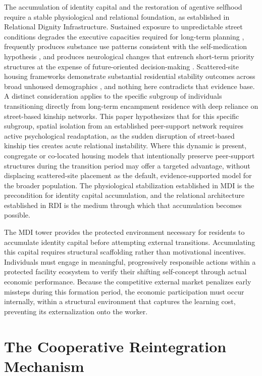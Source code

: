\documentclass[12pt, letterpaper]{article}
\begin{document}
The accumulation of identity capital and the restoration of agentive selfhood require a stable physiological and relational foundation, as established in Relational Dignity Infrastructure. Sustained exposure to unpredictable street conditions degrades the executive capacities required for long-term planning \citep{arnsten2009stress}, frequently produces substance use patterns consistent with the self-medication hypothesis \citep{khantzian1985self}, and produces neurological changes that entrench short-term priority structures at the expense of future-oriented decision-making \citep{volkow2016neurobiologic}. Scattered-site housing frameworks demonstrate substantial residential stability outcomes across broad unhoused demographics \citep{tsemberis2004housing}, and nothing here contradicts that evidence base. A distinct consideration applies to the specific subgroup of individuals transitioning directly from long-term encampment residence with deep reliance on street-based kinship networks. This paper hypothesizes that for this specific subgroup, spatial isolation from an established peer-support network requires active psychological readaptation, as the sudden disruption of street-based kinship ties creates acute relational instability. Where this dynamic is present, congregate or co-located housing models that intentionally preserve peer-support structures during the transition period may offer a targeted advantage, without displacing scattered-site placement as the default, evidence-supported model for the broader population. The physiological stabilization established in MDI is the precondition for identity capital accumulation, and the relational architecture established in RDI is the medium through which that accumulation becomes possible.

The MDI tower provides the protected environment necessary for residents to accumulate identity capital before attempting external transitions. Accumulating this capital requires structural scaffolding rather than motivational incentives. Individuals must engage in meaningful, progressively responsible actions within a protected facility ecosystem to verify their shifting self-concept through actual economic performance. Because the competitive external market penalizes early missteps during this formation period, the economic participation must occur internally, within a structural environment that captures the learning cost, preventing its externalization onto the worker.

\section{The Cooperative Reintegration Mechanism}
\end{document}
